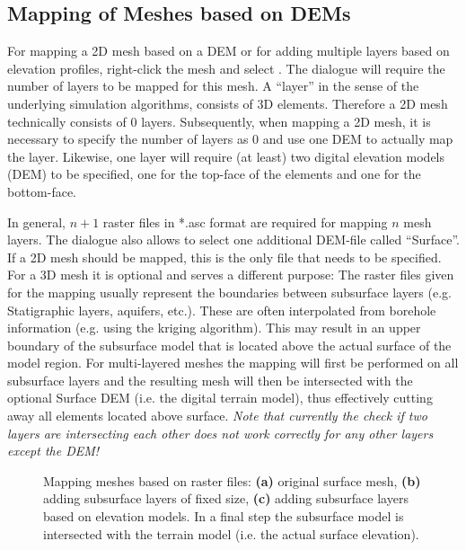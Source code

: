 \subsection{Mapping of Meshes based on DEMs}

For mapping a 2D mesh based on a DEM or for adding multiple layers based on elevation profiles, right-click the mesh and select . The dialogue will require the number of layers to be mapped for this mesh. A ``layer'' in the sense of the underlying simulation algorithms, consists of 3D elements. Therefore a 2D mesh technically consists of $0$ layers. Subsequently, when mapping a 2D mesh, it is necessary to specify the number of layers as $0$ and use one DEM to actually map the layer. Likewise, one layer will require (at least) two digital elevation models (DEM) to be specified, one for the top-face of the elements and one for the bottom-face.

In general, $n+1$ raster files in *.asc format are required for mapping $n$ mesh layers. The dialogue also allows to select one additional DEM-file called ``Surface''. If a 2D mesh should be mapped, this is the only file that needs to be specified. For a 3D mesh it is optional and serves a different purpose: The raster files given for the mapping usually represent the boundaries between subsurface layers (e.g. Statigraphic layers, aquifers, etc.). These are often interpolated from borehole information (e.g. using the kriging algorithm). This may result in an upper boundary of the subsurface model that is located above the actual surface of the model region. For multi-layered meshes the mapping will first be performed on all subsurface layers and the resulting mesh will then be intersected with the optional Surface DEM (i.e. the digital terrain model), thus effectively cutting away all elements located above surface. \emph{Note that currently the check if two layers are intersecting each other does \emph{not} work correctly for any other layers except the DEM!}

\begin{figure}[tb]
\begin{center}
\enspace
{}\enspace
{}
\end{center}
\caption{Mapping meshes based on raster files: \textbf{(a)} original surface mesh, \textbf{(b)} adding subsurface layers of fixed size, \textbf{(c)} adding subsurface layers based on elevation models. In a final step the subsurface model is intersected with the terrain model (i.e. the actual surface elevation).}
\label{fig:RasterMapping}
\end{figure}


